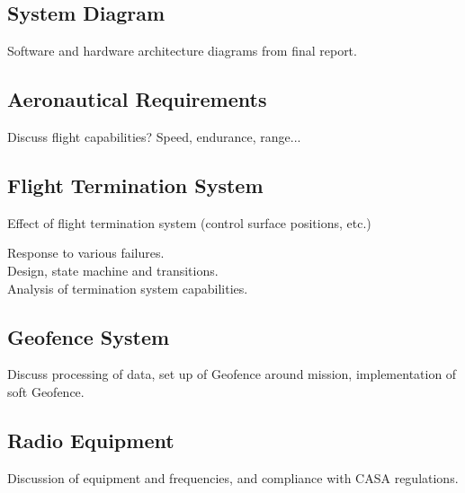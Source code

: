 \subsection{System Diagram}
Software and hardware architecture diagrams from final report.

\subsection{Aeronautical Requirements}
Discuss flight capabilities? Speed, endurance, range...

\subsection{Flight Termination System}
Effect of flight termination system (control surface positions, etc.)

Response to various failures.\\

Design, state machine and transitions.\\

Analysis of termination system capabilities.

\subsection{Geofence System}
Discuss processing of data, set up of Geofence around mission, implementation of soft Geofence.

\subsection{Radio Equipment}
Discussion of equipment and frequencies, and compliance with CASA regulations.